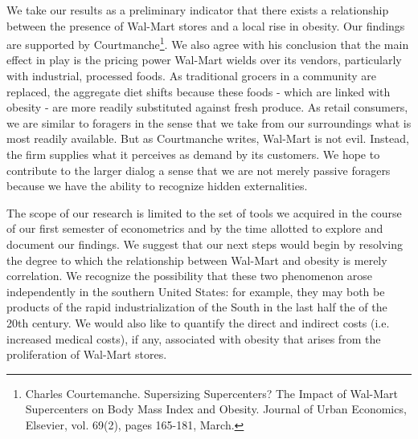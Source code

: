 \fontsize{12bp}{14bp}\selectfont
We take our results as a preliminary indicator that there exists a relationship between the presence of Wal-Mart stores and a local rise in obesity.  Our findings are supported by Courtmanche\footnote{Charles Courtemanche. Supersizing Supercenters? The Impact of Wal-Mart Supercenters on Body Mass Index and Obesity.
Journal of Urban Economics, Elsevier, vol. 69(2), pages 165-181, March.}.  We also agree with his conclusion that the main effect in play is the pricing power Wal-Mart wields over its vendors, particularly with industrial, processed foods.  As traditional grocers in a community are replaced, the aggregate diet shifts because these foods - which are linked with obesity - are more readily substituted against fresh produce.  As retail consumers, we are similar to foragers in the sense that we take from our surroundings what is most readily available.  But as Courtmanche writes, Wal-Mart is not evil.  Instead, the firm supplies what it perceives as demand by its customers.  We hope to contribute to the larger dialog a sense that we are not merely passive foragers because we have the ability to recognize hidden externalities.

The scope of our research is limited to the set of tools we acquired in the course of our first semester of econometrics and by the time allotted to explore and document our findings.  We suggest that our next steps would begin by resolving the degree to which the relationship between Wal-Mart and obesity is merely correlation.  We recognize the possibility that these two phenomenon arose independently in the southern United States: for example, they may both be products of the rapid industrialization of the South in the last half the of the 20th century.  We would also like to quantify the direct and indirect costs (i.e. increased medical costs), if any, associated with obesity that arises from the proliferation of Wal-Mart stores.  